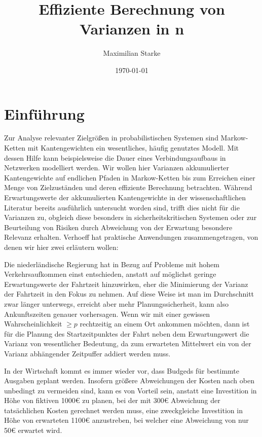 \documentclass[a4paper]{article}
\title{Effiziente Berechnung von Varianzen in \mc{}n}%
\author{Maximilian Starke}
\affil{Fakultät für Informatik, Technische Universität Dresden}
\date{\today}
\newcommand{\mc}{Markow-Kette}
\theoremstyle{nonumberplain}
\begin{document}
\maketitle
\vspace{6em}
\tableofcontents
\pagebreak

\section{Einführung}

Zur Analyse relevanter Zielgrößen in probabilistischen Systemen sind \mc{}n mit Kantengewichten ein wesentliches, häufig genutztes Modell. Mit dessen Hilfe kann beispielsweise die Dauer eines Verbindungsaufbaus in Netzwerken modelliert werden. Wir wollen hier Varianzen akkumulierter Kantengewichte auf endlichen Pfaden in \mc{}n bis zum Erreichen einer Menge von Zielzuständen und deren effiziente Berechnung betrachten.
Während Erwartungswerte der akkumulierten Kantengewichte in der wissenschaftlichen Literatur bereits ausführlich untersucht worden sind, trifft dies nicht für die Varianzen zu, obgleich diese besonders in sicherheitskritischen Systemen oder zur Beurteilung von Risiken durch Abweichung von der Erwartung besondere Relevanz erhalten.
Verhoeff \cite{Verh04} hat praktische Anwendungen zusammengetragen, von denen wir hier zwei erläutern wollen:

Die niederländische Regierung hat in Bezug auf Probleme mit hohem Verkehrsaufkommen einst entschieden, anstatt auf möglichst geringe Erwartungswerte der Fahrtzeit hinzuwirken, eher die Minimierung der Varianz der Fahrtzeit in den Fokus zu nehmen. Auf diese Weise ist man im Durchschnitt zwar länger unterwegs, erreicht aber mehr Planungssicherheit, kann also Ankunftszeiten genauer vorhersagen.
Wenn wir mit einer gewissen Wahrscheinlichkeit $\geq p$ rechtzeitig an einem Ort ankommen möchten, dann ist für die Planung des Startzeitpunktes der Fahrt neben dem Erwartungswert die Varianz von wesentlicher Bedeutung, da zum erwarteten Mittelwert ein von der Varianz abhängender Zeitpuffer addiert werden muss.

In der Wirtschaft kommt es immer wieder vor, dass Budgeds für bestimmte Ausgaben geplant werden. Insofern größere Abweichungen der Kosten nach oben unbedingt zu vermeiden sind, kann es von Vorteil sein, anstatt eine Investition in Höhe von fiktiven 1000\euro{} zu planen, bei der mit 300\euro{} Abweichung der tatsächlichen Kosten gerechnet werden muss, eine zweckgleiche Investition in Höhe von erwarteten 1100\euro{} anzustreben, bei welcher eine Abweichung von nur 50\euro{} erwartet wird.
\end{document}
